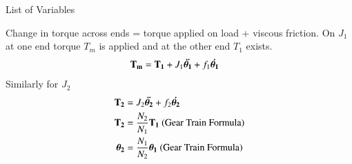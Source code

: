 \begin{table}[!ht]
\centering

\caption{List of Variables}
\label{table:ee18btech11001_3}
\end{table}
Change in torque across ends = torque applied on load + viscous friction. On $J_{1}$ at one end torque $T_{m}$ is applied and at the other end $T_{1}$ exists.
\begin{align}
    \mathbf{T_{m}} &= \mathbf{T_{1}} + J_{1}\bm{\Ddot{\theta_{1}}} + f_{1}\bm{\Dot{\theta_{1}}} 
    \label{eq:ee18btech11001_2}
\end{align}
Similarly for $J_{2}$
\begin{align}
    \mathbf{T_{2}} &=  J_{2}\bm{\Ddot{\theta_{2}}} + f_{2}\bm{\Dot{\theta_{2}}} 
    \label{eq:ee18btech11001_3}
    \\
    \mathbf{T_{2}} &= \frac{N_{2}}{N_{1}} \mathbf{T_{1}} \text{ (Gear Train Formula)} \label{eq:ee18btech11001_4}
    \\
    \bm{\theta_{2}} &= \frac{N_{1}}{N_{2}} \bm{\theta_{1}} \text{ (Gear Train Formula)} \label{eq:ee18btech11001_5}
\end{align}

